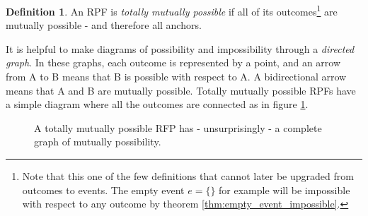 \documentclass[twoside]{article}
\theoremstyle{plain}%
\theoremstyle{definition}
\newtheorem{definition}{Definition}[section]
\theoremstyle{remark}
\begin{document}
\begin{definition}
\label{def:totally_mutually_possible}
An RPF is \textit{totally mutually possible} if all of its outcomes\footnote{Note that this one of the few definitions that cannot later be upgraded from outcomes to events. The empty event \(e = \{\}\) for example will be impossible with respect to any outcome by theorem \ref{thm:empty_event_impossible}.} are mutually possible - and therefore all anchors.
\end{definition}

It is helpful to make diagrams of possibility and impossibility through a \textit{directed graph}. In these graphs, each outcome is represented by a point, and an arrow from A to B means that B is possible with respect to A. A bidirectional arrow means that A and B are mutually possible. Totally mutually possible RPFs have a simple diagram where all the outcomes are connected as in figure \ref{fig:mutually_possible_rpf}.

\begin{figure}[h]
\centering
{}
\caption{A totally mutually possible RFP has - unsurprisingly - a complete graph of mutually possibility.}
\label{fig:mutually_possible_rpf}
\end{figure}
\end{document}
